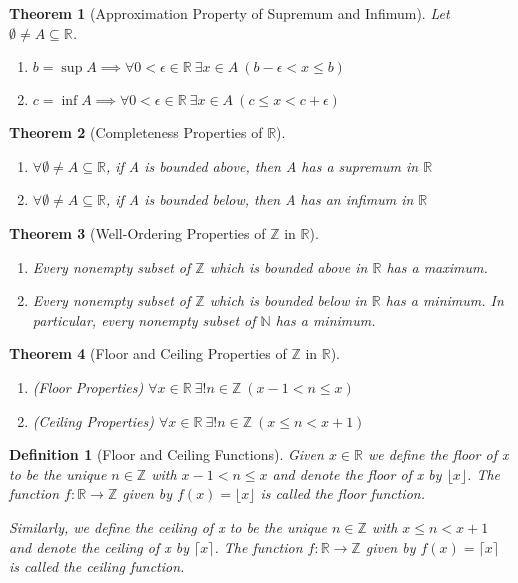 \documentclass[11pt, oneside]{book}
\theoremstyle{break}
\newtheorem{thm}{Theorem}[section]
\newtheorem{defn}{Definition}[section]
\newcommand{\bb}[1]{\mathbb{#1}}		%
\newcommand{\floor}[1]{\lfloor #1 \rfloor}	%
\newcommand{\ceiling}[1]{\lceil #1 \rceil}	%
\begin{document}
\begin{thm}[Approximation Property of Supremum and Infimum]
	Let $\emptyset \neq A \subseteq \bb{R}$.
	\begin{enumerate}
		\item $b = \sup A \implies \forall 0 < \epsilon \in \bb{R} \> \exists x \in A \> (b - \epsilon < x \leq b)$
		\item $c = \inf A \implies \forall 0 < \epsilon \in \bb{R} \> \exists x \in A \> (c \leq x < c + \epsilon)$
	\end{enumerate}
\end{thm}

\begin{thm}[Completeness Properties of $\bb{R}$]
	\begin{enumerate}
		\item $\forall \emptyset \neq A \subseteq \bb{R}$, if A is bounded above, then A has a supremum in $\bb{R}$
		\item $\forall \emptyset \neq A \subseteq \bb{R}$, if A is bounded below, then A has an infimum in $\bb{R}$
	\end{enumerate}
\end{thm}

\begin{thm}[Well-Ordering Properties of $\bb{Z}$ in $\bb{R}$]
	\begin{enumerate}
		\item Every nonempty subset of $\bb{Z}$ which is bounded above in $\bb{R}$ has a maximum.
		\item Every nonempty subset of $\bb{Z}$ which is bounded below in $\bb{R}$ has a minimum. In particular, every nonempty subset of $\bb{N}$ has a minimum.
	\end{enumerate}
\end{thm}

\begin{thm}[Floor and Ceiling Properties of $\bb{Z}$ in $\bb{R}$]
	\begin{enumerate}
		\item (Floor Properties) $\forall x \in \bb{R} \> \exists! n \in \bb{Z} \> (x - 1 < n \leq x)$
		\item (Ceiling Properties) $\forall x \in \bb{R} \> \exists! n \in \bb{Z} \> (x \leq n < x + 1)$
	\end{enumerate}	
\end{thm}

\begin{defn}[Floor and Ceiling Functions]
	Given $x \in \bb{R}$ we define the floor of x to be the unique $n \in \bb{Z}$ with $x - 1 < n \leq x$ and denote the floor of x by $\floor{x}$. The function $f: \bb{R} \to \bb{Z}$ given by $f(x) = \floor{x}$ is called the floor function.

	Similarly, we define the ceiling of x to be the unique $n \in \bb{Z}$ with $x \leq n < x + 1$ and denote the ceiling of x by $\ceiling{x}$. The function $f: \bb{R} \to \bb{Z}$ given by $f(x) = \ceiling{x}$ is called the ceiling function.
\end{defn}
\end{document}
